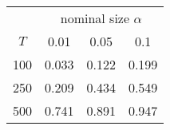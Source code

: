 % 
\begin{tabular}{cccc}
  \hline
  & \multicolumn{3}{c}{nominal size $\alpha$} \\
 $T$ & 0.01 & 0.05 & 0.1 \\
 \hline
100 & 0.033 & 0.122 & 0.199 \\ 
  250 & 0.209 & 0.434 & 0.549 \\ 
  500 & 0.741 & 0.891 & 0.947 \\ 
   \hline
\end{tabular}
